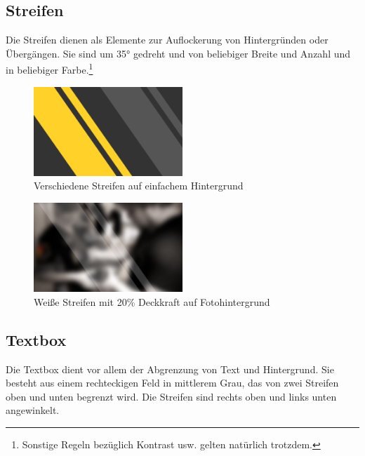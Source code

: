\documentclass{article}
\begin{document}

\subsection{Streifen}
Die Streifen dienen als Elemente zur Auflockerung von Hintergründen oder Übergängen.
Sie sind um 35° gedreht und von beliebiger Breite und Anzahl und in beliebiger Farbe.\footnote{Sonstige Regeln bezüglich Kontrast usw. gelten natürlich trotzdem.}

\begin{figure}[H]
\begin{center}
\includegraphics[width=0.5\textwidth]{Docs/streifen_beispiel.png}
\end{center}
\caption{Verschiedene Streifen auf einfachem Hintergrund}
\end{figure}

\begin{figure}[H]
\begin{center}
\includegraphics[width=0.5\textwidth]{Docs/streifen_foto.png}
\end{center}
\caption{Weiße Streifen mit 20\% Deckkraft auf Fotohintergrund}
\end{figure}

\subsection{Textbox}
Die Textbox dient vor allem der Abgrenzung von Text und Hintergrund.
Sie besteht aus einem rechteckigen Feld in mittlerem Grau, das von zwei Streifen oben und unten begrenzt wird.
Die Streifen sind rechts oben und links unten angewinkelt.
\end{document}
